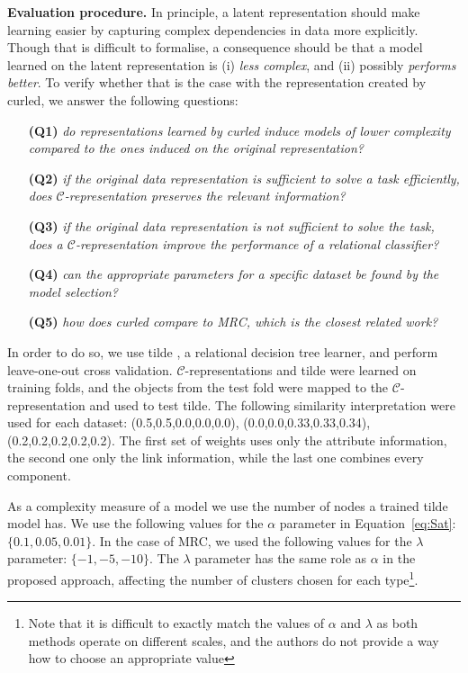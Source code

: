 \textbf{Evaluation procedure.}
In principle, a latent representation should make learning easier by capturing complex dependencies in data more explicitly.
Though that is difficult to formalise, a consequence should be that a model learned on the latent representation is (i) \textit{less complex}, and (ii) possibly \textit{performs better}.
To verify whether that is the case with the representation created by \gls{curled}, we answer the following questions:
\begin{itemize}
	\setlength\itemsep{0.06em}
    \item[\textbf{(Q1)}] \textit{do representations learned by \gls{curled} induce models of lower complexity compared to the ones induced on the original representation?}
    \item[\textbf{(Q2)}] \textit{if the original data representation is sufficient to solve a task efficiently, does $\mathcal{C}$-representation preserves the relevant information?}
    \item[\textbf{(Q3)}] \textit{if the original data representation is not sufficient to solve the task, does a $\mathcal{C}$-representation improve the performance of a relational classifier?}
    \item[\textbf{(Q4)}] \textit{can the appropriate parameters for a specific dataset be found by the model selection?}
    \item[\textbf{(Q5)}] \textit{how does \gls{curled} compare to MRC, which is the closest related work?}
\end{itemize}


In order to do so, we use \gls{tilde} \cite{Blockeel1998285}, a relational decision tree learner, and perform leave-one-out cross validation.
$\mathcal{C}$-representations and \gls{tilde} were learned on training folds, and the objects from the test fold were mapped to the $\mathcal{C}$-representation and used to test \gls{tilde}.
The following similarity interpretation were used for each dataset: (0.5,0.5,0.0,0.0,0.0), (0.0,0.0,0.33,0.33,0.34), (0.2,0.2,0.2,0.2,0.2).
The first set of weights uses only the attribute information, the second one only the link information, while the last one combines every component.



As a complexity measure of a model we use the number of nodes a trained \gls{tilde} model has.
We use the following values for the $\alpha$ parameter in Equation~\ref{eq:Sat}: $\{ 0.1,0.05, 0.01 \}$.
In the case of MRC, we used the following values for the $\lambda$ parameter: $\{-1,-5,-10\}$.
The $\lambda$ parameter has the same role as $\alpha$ in the proposed approach, affecting the number of clusters chosen for each type\footnote{Note that it is difficult to exactly match the values of $\alpha$ and $\lambda$ as both methods operate on different scales, and the authors do not provide a way how to choose an appropriate value}.




